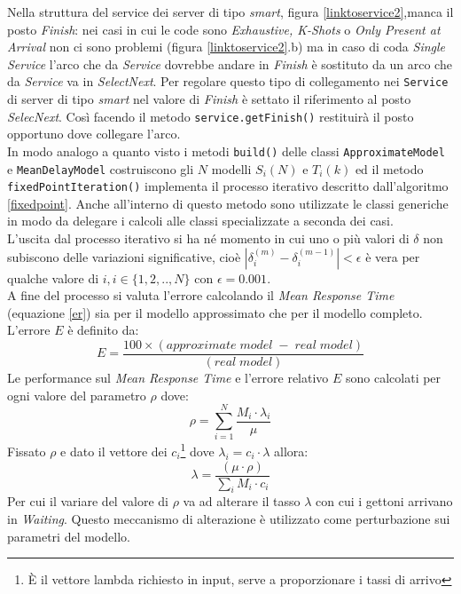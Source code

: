 \documentclass[12pt,a4paper,italian]{article}
\begin{document}
Nella struttura del service dei server di tipo \emph{smart}, figura \ref{linktoservice2},manca il posto \emph{Finish}: nei casi in cui le code sono \emph{Exhaustive, K-Shots} o \emph{Only Present at Arrival} non ci sono problemi (figura \ref{linktoservice2}.b) ma in caso di coda \emph{Single Service} l'arco che da \emph{Service} dovrebbe andare in \emph{Finish} è sostituto da un arco che da \emph{Service} va in \emph{SelectNext}. Per regolare questo tipo di collegamento nei \texttt{Service} di server di tipo \emph{smart} nel valore di \emph{Finish} è settato il riferimento al posto \emph{SelecNext}. Così facendo il metodo \texttt{service.getFinish()} restituirà il posto opportuno dove collegare l'arco.\\
\newline
In modo analogo a quanto visto i metodi \texttt{build()} delle classi \texttt{ApproximateModel} e \texttt{MeanDelayModel} costruiscono gli $N$ modelli $S_i(N)$ e $T_i(k)$ ed il metodo \texttt{fixedPointIteration()} implementa il processo iterativo descritto dall'algoritmo \ref{fixedpoint}. Anche all'interno di questo metodo sono utilizzate le classi generiche in modo da delegare i calcoli alle classi specializzate a seconda dei casi.\\ 
L'uscita dal processo iterativo si ha né momento in cui uno o più valori di $\delta$ non subiscono delle variazioni significative, cioè $|\delta_i^{(m)} - \delta_i^{(m-1)}|<\epsilon$  è vera per qualche valore di $i, i \in \{1,2,..,N\}$ con $\epsilon=0.001$.\\
A fine del processo si valuta l'errore calcolando il \emph{Mean Response Time} (equazione \ref{er}) sia per il modello approssimato che per il modello completo. 
L'errore $E$ è definito da:
\begin{equation*}
E = \frac{100\times(approximate\;model\; -\; real\;model )}{( real\;model)}
\end{equation*}
Le performance sul \emph{Mean Response Time} e l'errore relativo $E$ sono calcolati per ogni valore del parametro $\rho$ dove:
\begin{equation}
\rho = \sum_{i=1}^{N} \frac{M_i\cdot\lambda_i}{\mu} 
\label{error}
\end{equation}
Fissato $\rho$ e dato il vettore dei $c_i$\footnote{È il vettore lambda richiesto in input, serve a proporzionare i tassi di arrivo} dove $\lambda_i = c_i\cdot \lambda$  allora:
\begin{equation*}
\lambda = \frac{(\mu\cdot\rho)}{\sum_i M_i \cdot c_i}
\end{equation*}
Per cui il variare del valore di $\rho$ va ad alterare il tasso $\lambda$ con cui i gettoni arrivano in \emph{Waiting}.
Questo meccanismo di alterazione è utilizzato come perturbazione sui parametri del modello.
\newpage
\end{document}
